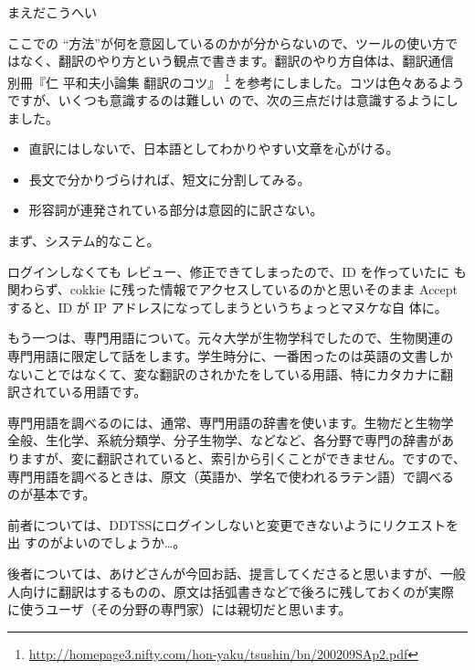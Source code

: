 \begin{prework}{まえだこうへい}


ここでの ``方法''が何を意図しているのかが分からないので、ツールの使い方で
 はなく、翻訳のやり方という観点で書きます。翻訳のやり方自体は、翻訳通信 別冊『仁
 平和夫小論集 翻訳のコツ』
 \footnote{\url{http://homepage3.nifty.com/hon-yaku/tsushin/bn/200209SAp2.pdf}}
 を参考にしました。コツは色々あるようですが、いくつも意識するのは難しい
 ので、次の三点だけは意識するようにしました。

\begin{itemize}
 \item 直訳にはしないで、日本語としてわかりやすい文章を心がける。
 \item 長文で分かりづらければ、短文に分割してみる。
 \item 形容詞が連発されている部分は意図的に訳さない。
\end{itemize}


 まず、システム的なこと。

 ログインしなくても レビュー、修正できてしまったので、ID を作っていたに
 も関わらず、cokkie に残った情報でアクセスしているのかと思いそのまま
 Accept すると、ID が IP アドレスになってしまうというちょっとマヌケな自
 体に。


 もう一つは、専門用語について。元々大学が生物学科でしたので、生物関連の
 専門用語に限定して話をします。学生時分に、一番困ったのは英語の文書しか
 ないことではなくて、変な翻訳のされかたをしている用語、特にカタカナに翻
 訳されている用語です。

 専門用語を調べるのには、通常、専門用語の辞書を使います。生物だと生物学
 全般、生化学、系統分類学、分子生物学、などなど、各分野で専門の辞書があ
 りますが、変に翻訳されていると、索引から引くことができません。ですので、
 専門用語を調べるときは、原文（英語か、学名で使われるラテン語）で調べる
 のが基本です。


 前者については、DDTSSにログインしないと変更できないようにリクエストを出
 すのがよいのでしょうか…。


 後者については、あけどさんが今回お話、提言してくださると思いますが、一般
 人向けに翻訳はするものの、原文は括弧書きなどで後ろに残しておくのが実際
 に使うユーザ（その分野の専門家）には親切だと思います。

\end{prework}

